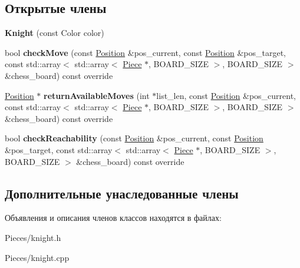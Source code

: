 \subsection*{Открытые члены}
\begin{DoxyCompactItemize}
\item 
\mbox{\label{class_chess_1_1_knight_a74ada3d5ae9ac1b5ae259ceba34289dd}} 
{\bfseries Knight} (const Color color)
\item 
\mbox{\label{class_chess_1_1_knight_a56ce2d3c2ee43f9bbb7a2de40dd294c3}} 
bool {\bfseries check\+Move} (const \mbox{\hyperlink{class_chess_1_1_position}{Position}} \&pos\+\_\+current, const \mbox{\hyperlink{class_chess_1_1_position}{Position}} \&pos\+\_\+target, const std\+::array$<$ std\+::array$<$ \mbox{\hyperlink{class_chess_1_1_piece}{Piece}} $\ast$, B\+O\+A\+R\+D\+\_\+\+S\+I\+ZE $>$, B\+O\+A\+R\+D\+\_\+\+S\+I\+ZE $>$ \&chess\+\_\+board) const override
\item 
\mbox{\label{class_chess_1_1_knight_af52d6ea731a3615a6d6e1c0a5985e1ad}} 
\mbox{\hyperlink{class_chess_1_1_position}{Position}} $\ast$ {\bfseries return\+Available\+Moves} (int $\ast$list\+\_\+len, const \mbox{\hyperlink{class_chess_1_1_position}{Position}} \&pos\+\_\+current, const std\+::array$<$ std\+::array$<$ \mbox{\hyperlink{class_chess_1_1_piece}{Piece}} $\ast$, B\+O\+A\+R\+D\+\_\+\+S\+I\+ZE $>$, B\+O\+A\+R\+D\+\_\+\+S\+I\+ZE $>$ \&chess\+\_\+board) const override
\item 
\mbox{\label{class_chess_1_1_knight_a2cd473555390e4cb9e5f0ac0594e91f2}} 
bool {\bfseries check\+Reachability} (const \mbox{\hyperlink{class_chess_1_1_position}{Position}} \&pos\+\_\+current, const \mbox{\hyperlink{class_chess_1_1_position}{Position}} \&pos\+\_\+target, const std\+::array$<$ std\+::array$<$ \mbox{\hyperlink{class_chess_1_1_piece}{Piece}} $\ast$, B\+O\+A\+R\+D\+\_\+\+S\+I\+ZE $>$, B\+O\+A\+R\+D\+\_\+\+S\+I\+ZE $>$ \&chess\+\_\+board) const override
\end{DoxyCompactItemize}
\subsection*{Дополнительные унаследованные члены}


Объявления и описания членов классов находятся в файлах\+:\begin{DoxyCompactItemize}
\item 
Pieces/knight.\+h\item 
Pieces/knight.\+cpp\end{DoxyCompactItemize}
